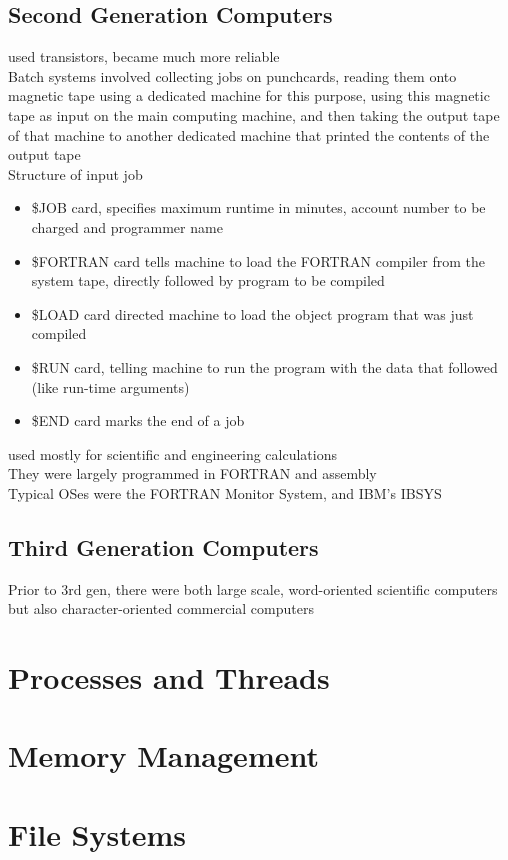 \documentclass{article}
\begin{document}
\subsection*{Second Generation Computers}
used transistors, became much more reliable
\\Batch systems involved collecting jobs on punchcards, reading them onto magnetic tape using a dedicated machine for this purpose, using this magnetic tape as input on the main computing machine, and then taking the output tape of that machine to another dedicated machine that printed the contents of the output tape
\\Structure of input job
\begin{itemize}
	\item \$JOB card, specifies maximum runtime in minutes, account number to be charged and programmer name
	\item \$FORTRAN card tells machine to load the FORTRAN compiler from the system tape, directly followed by program to be compiled
	\item \$LOAD card directed machine to load the object program that was just compiled
	\item \$RUN card, telling machine to run the program with the data that followed (like run-time arguments)
	\item \$END card marks the end of a job
\end{itemize}
used mostly for scientific and engineering calculations
\\They were largely programmed in FORTRAN and assembly
\\Typical OSes were the FORTRAN Monitor System, and IBM's IBSYS
\subsection*{Third Generation Computers}
Prior to 3rd gen, there were both large scale, word-oriented scientific computers but also character-oriented commercial computers
\section{Processes and Threads}

\section{Memory Management}

\section{File Systems}
\end{document}
